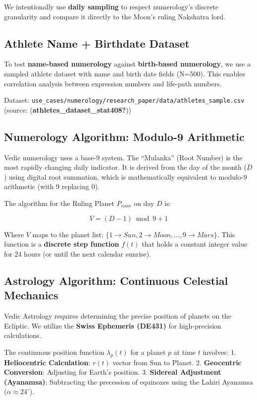 \documentclass[
  11pt,
  a4paper,
  oneside,
  openany]{article}
\begin{document}
We intentionally use \textbf{daily sampling} to respect numerology's
discrete granularity and compare it directly to the Moon's ruling
Nakshatra lord.

\subsection{Athlete Name + Birthdate
Dataset}\label{athlete-name-birthdate-dataset}

To test \textbf{name-based numerology} against \textbf{birth-based
numerology}, we use a sampled athlete dataset with name and birth date
fields (N=500). This enables correlation analysis between expression
numbers and life-path numbers.

Dataset:
\texttt{use\_cases/numerology/research\_paper/data/athletes\_sample.csv}
(source: (\textbf{athletes\_dataset\_stat408?}))

\subsection{Numerology Algorithm: Modulo-9
Arithmetic}\label{numerology-algorithm-modulo-9-arithmetic}

Vedic numerology uses a base-9 system. The ``Mulanka'' (Root Number) is
the most rapidly changing daily indicator. It is derived from the day of
the month (\(D\)) using digital root summation, which is mathematically
equivalent to modulo-9 arithmetic (with 9 replacing 0).

The algorithm for the Ruling Planet \(P_{num}\) on day \(D\) is:

\[
V = (D - 1) \bmod 9 + 1
\]

Where \(V\) maps to the planet list:
\(\{1 \to Sun, 2 \to Moon, \dots, 9 \to Mars\}\). This function is a
\textbf{discrete step function} \(f(t)\) that holds a constant integer
value for 24 hours (or until the next calendar sunrise).

\subsection{Astrology Algorithm: Continuous Celestial
Mechanics}\label{astrology-algorithm-continuous-celestial-mechanics}

Vedic Astrology requires determining the precise position of planets on
the Ecliptic. We utilize the \textbf{Swiss Ephemeris (DE431)} for
high-precision calculations.

The continuous position function \(\lambda_p(t)\) for a planet \(p\) at
time \(t\) involves: 1. \textbf{Heliocentric Calculation}: \(r(t)\)
vector from Sun to Planet. 2. \textbf{Geocentric Conversion}: Adjusting
for Earth's position. 3. \textbf{Sidereal Adjustment (Ayanamsa)}:
Subtracting the precession of equinoxes using the Lahiri Ayanamsa
(\(\alpha \approx 24^\circ\)).
\end{document}
